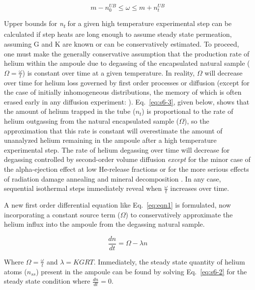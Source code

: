 \begin{equation}
m - n_{0}^{UB} \leq \omega \leq m + n_{t}^{UB}
\label{eq:s6-1}
\end{equation}

Upper bounds for \emph{n\textsubscript{t}} for a given high temperature
experimental step can be calculated if step heats are long enough to
assume steady state permeation, assuming G and K are known or can be
conservatively estimated. To proceed, one must make the generally
conservative assumption that the production rate of helium within the
ampoule due to degassing of the encapsulated natural sample
(\(\Omega = \frac{\omega}{t}\)) is constant over time at a given
temperature. In reality, \(\Omega\) will decrease over time for helium
loss governed by first order processes \citep{yakubovich2010,wilson1973} or diffusion (except for the case of initially
inhomogeneous distributions, the memory of which is often erased early
in any diffusion experiment: \citealp{shuster2004}). Eq.~\eqref{eq:s6-3}, given
below, shows that the amount of helium trapped in the tube (\(n_{t}\))
is proportional to the rate of helium outgassing from the natural
encapsulated sample (\(\Omega\)), so the approximation that this rate is
constant will overestimate the amount of unanalyzed helium remaining in
the ampoule after a high temperature experimental step. The rate of
helium degassing over time will decrease for degassing controlled by
second-order volume diffusion \emph{except} for the minor case of the
alpha-ejection effect at low He-release fractions \citep{farley1996,ketcham2011} or for the more serious effects of radiation
damage annealing \citep{goldsmith2020} and mineral decomposition
\citep{farley2024}. In any case, sequential isothermal steps
immediately reveal when \(\frac{\omega}{t}\) increases over time.

A new first order differential equation like Eq.~\eqref{eq:eqn1} is formulated, now
incorporating a constant source term (\(\Omega\)) to conservatively
approximate the helium influx into the ampoule from the degassing
natural sample.

\begin{equation}
\frac{dn}{dt} = \Omega - \lambda n
\label{eq:s6-2}
\end{equation}

Where \(\Omega = \frac{\omega}{t}\) and \(\lambda = KGRT\). Immediately,
the steady state quantity of helium atoms (\(n_{ss}\)) present in the
ampoule can be found by solving Eq.~\eqref{eq:s6-2} for the steady state condition
where \(\frac{dn}{dt} = 0\).

